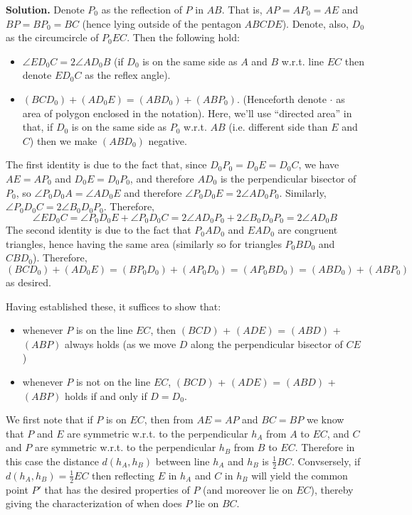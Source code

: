 \documentclass[11pt,a4paper]{article}
\begin{document}
\begin{enumerate}
	\textbf{Solution.} Denote $P_0$ as the reflection of $P$ in $AB$. That is, $AP=AP_0=AE$ and $BP=BP_0=BC$ (hence lying outside of the pentagon $ABCDE$). 
	Denote, also, $D_0$ as the circumcircle of $P_0EC$. Then the following hold: 
	\begin{itemize}
		\item $\angle ED_0C=2\angle AD_0B$ (if $D_0$ is on the same side as $A$ and $B$ w.r.t. line $EC$ then denote $ED_0C$ as the reflex angle). 
		\item $(BCD_0)+(AD_0E)=(ABD_0)+(ABP_0)$. (Henceforth denote $\cdot$ as area of polygon enclosed in the notation). Here, we'll use ``directed area'' in that, if $D_0$ is on the same side as $P_0$ w.r.t. $AB$ (i.e. different side than $E$ and $C$) then we make $(ABD_0)$ negative. 
	\end{itemize}
	The first identity is due to the fact that, since $D_0P_0=D_0E=D_0C$, we have $AE=AP_0$ and $D_0E=D_0P_0$, and therefore $AD_0$ is the perpendicular bisector of $P_0$, so $\angle P_0D_0A=\angle AD_0E$ and therefore $\angle P_0D_0E=2\angle AD_0P_0$. Similarly, $\angle P_0D_0C=2\angle B_0D_0P_0$. Therefore, 
	\[
	\angle ED_0C=\angle P_0D_0E+\angle P_0D_0C=2\angle AD_0P_0+2\angle B_0D_0P_0=2\angle AD_0B
	\]
	The second identity is due to the fact that $P_0AD_0$ and $EAD_0$ are congruent triangles, hence having the same area (similarly so for triangles $P_0BD_0$ and $CBD_0$). Therefore, 
	\[
	(BCD_0)+(AD_0E)=(BP_0D_0)+(AP_0D_0)=(AP_0BD_0)=(ABD_0)+(ABP_0)
	\]
	as desired. 
	
	Having established these, it suffices to show that: 
	\begin{itemize}
		\item whenever $P$ is on the line $EC$, then $(BCD)$ + $(ADE)$ = $(ABD)$ + $(ABP)$ always holds (as we move $D$ along the perpendicular bisector of $CE$)
		
		\item whenever $P$ is not on the line $EC$, $(BCD)$ + $(ADE)$ = $(ABD)$ + $(ABP)$ holds if and only if $D=D_0$. 
	\end{itemize}
	
	We first note that if $P$ is on $EC$, then from $AE=AP$ and $BC=BP$ we know that $P$ and $E$ are symmetric w.r.t. to the perpendicular $h_A$ from $A$ to $EC$, and $C$ and $P$ are symmetric w.r.t. to the perpendicular $h_B$ from $B$ to $EC$. Therefore in this case the distance $d(h_A, h_B)$ between line $h_A$ and $h_B$ is $\frac{1}{2}BC$. Convsersely, if $d(h_A, h_B)=\frac 12 EC$ then reflecting $E$ in $h_A$ and $C$ in $h_B$ will yield the common point $P'$ that has the desired properties of $P$ (and moreover lie on $EC$), thereby giving the characterization of when does $P$ lie on $BC$. 
	

\end{enumerate}
\end{document}
